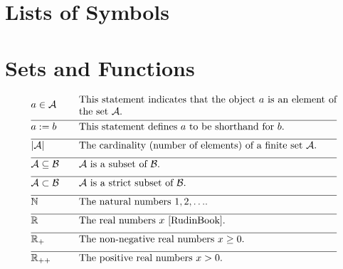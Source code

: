 
\section*{Lists of Symbols}

\vspace*{-2mm}
\section*{Sets and Functions} 

\begin{align} 
	&a \in \mathcal{A} & \quad & \parbox{.75\textwidth}{This statement indicates that the object $a$ is an element of the set $\mathcal{A}$.} \nonumber \\[2mm] \hline \nonumber\\[-5mm]
	&a \defeq b & \quad & \mbox{This statement defines $a$ to be shorthand for $b$. }\nonumber \\[2mm] \hline \nonumber\\[-5mm]
	&|\mathcal{A}| & \quad & \mbox{The cardinality (number of elements) of a finite set $\mathcal{A}$.}\nonumber \\[2mm] \hline \nonumber\\[-5mm]
	&\mathcal{A} \subseteq \mathcal{B}& \quad & \mbox{$\mathcal{A}$ is a subset of $\mathcal{B}$.}\nonumber \\[2mm] \hline \nonumber\\[-5mm]
	&\mathcal{A} \subset \mathcal{B}& \quad & \mbox{$\mathcal{A}$ is a strict subset of $\mathcal{B}$.} \nonumber \\[2mm] \hline \nonumber\\[-5mm]
	&\mathbb{N} & \quad & \mbox{The natural numbers $1,2,\ldots$.}\nonumber \\[2mm] \hline \nonumber\\[-5mm]
	&\mathbb{R}  &\quad &\mbox{The real numbers $x$ \cite{RudinBook}.} \nonumber \\[2mm] \hline \nonumber\\[-5mm]
	&\mathbb{R}_{+}  &\quad &\mbox{The non-negative real numbers $x\geq0$.}\nonumber \\[2mm] \hline \nonumber\\[-5mm]
	&\mathbb{R}_{++}  &\quad &\mbox{The positive real numbers $x> 0$.} \nonumber
\end{align} 

